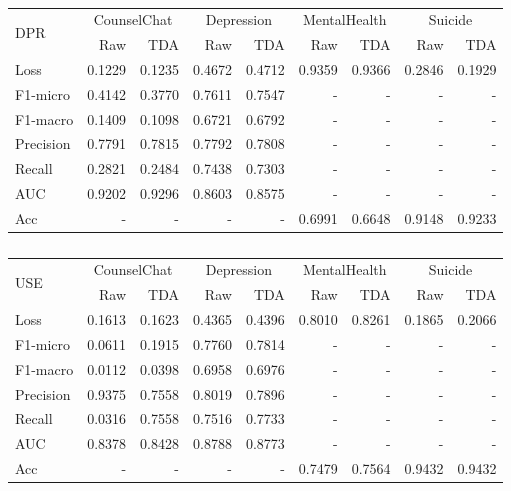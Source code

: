 \documentclass{article}
\begin{document}
\begin{table}[h!]
\begin{adjustbox}{width=\columnwidth,center}
\begin{tabular}[t]{lrrrrrrrr}
\toprule
\multirow{2}{*}{DPR} & \multicolumn{2}{c}{CounselChat} & \multicolumn{2}{c}{Depression}  & \multicolumn{2}{c}{MentalHealth} & \multicolumn{2}{c}{Suicide} \\
\cmidrule(l{3pt}r{3pt}){2-3} \cmidrule(l{3pt}r{3pt}){4-5} \cmidrule(l{3pt}r{3pt}){6-7} \cmidrule(l{3pt}r{3pt}){8-9}
 & Raw & TDA & Raw & TDA & Raw & TDA & Raw & TDA \\
\midrule 
Loss   & 0.1229 & 0.1235 & 0.4672 & 0.4712 & 0.9359 & 0.9366 & 0.2846 & 0.1929 \\
F1-micro   & 0.4142 & 0.3770 & 0.7611 & 0.7547 & - & - & - & - \\
F1-macro   & 0.1409 & 0.1098 & 0.6721 & 0.6792 & - & - & - & - \\
Precision  & 0.7791 & 0.7815 & 0.7792 & 0.7808 & - & - & - & - \\
Recall   & 0.2821 & 0.2484 & 0.7438 & 0.7303 & - & - & - & - \\
AUC   & 0.9202 & 0.9296 & 0.8603 & 0.8575 & - & - & - & - \\
Acc   & - & - & - & - & 0.6991 & 0.6648 & 0.9148 & 0.9233 \\ 
\bottomrule
\end{tabular}
\end{adjustbox}
\caption{}
\label{tbl:enc-enc_dpr}
\end{table}

\begin{table}[h!]
\begin{adjustbox}{width=\columnwidth,center}
\begin{tabular}[t]{lrrrrrrrr}
\toprule
\multirow{2}{*}{USE} & \multicolumn{2}{c}{CounselChat} & \multicolumn{2}{c}{Depression}  & \multicolumn{2}{c}{MentalHealth} & \multicolumn{2}{c}{Suicide} \\
\cmidrule(l{3pt}r{3pt}){2-3} \cmidrule(l{3pt}r{3pt}){4-5} \cmidrule(l{3pt}r{3pt}){6-7} \cmidrule(l{3pt}r{3pt}){8-9}
 & Raw & TDA & Raw & TDA & Raw & TDA & Raw & TDA \\
\midrule
Loss   & 0.1613 & 0.1623 & 0.4365 & 0.4396 & 0.8010 & 0.8261 & 0.1865 & 0.2066 \\
F1-micro   & 0.0611 & 0.1915 & 0.7760 & 0.7814 & - & - & - & - \\
F1-macro   & 0.0112 & 0.0398 & 0.6958 & 0.6976 & - & - & - & - \\
Precision  & 0.9375 & 0.7558 & 0.8019 & 0.7896 & - & - & - & - \\
Recall   & 0.0316 & 0.7558 & 0.7516 & 0.7733 & - & - & - & - \\
AUC   & 0.8378 & 0.8428 & 0.8788 & 0.8773 & - & - & - & - \\
Acc   & - & - & - & - & 0.7479 & 0.7564 & 0.9432 & 0.9432 \\ 
\bottomrule
\end{tabular}
\end{adjustbox}
\caption{}
\label{tbl:enc-enc_use}
\end{table}
\end{document}
